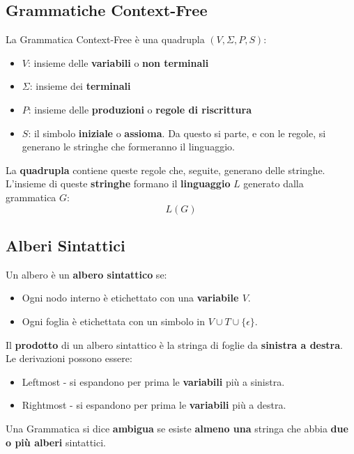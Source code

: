 \documentclass[12pt]{article}
\begin{document}
\subsection{Grammatiche Context-Free}
La Grammatica Context-Free è una quadrupla $(V,\Sigma,P,S)$:
\begin{itemize}
    \item $V$: insieme delle \textbf{variabili} o \textbf{non terminali}
    \item $\Sigma$: insieme dei \textbf{terminali}
    \item $P$: insieme delle \textbf{produzioni} o \textbf{regole di riscrittura}
    \item $S$: il simbolo \textbf{iniziale} o \textbf{assioma}. Da questo si parte, e con le regole, si generano le stringhe che formeranno il linguaggio.
\end{itemize}
La \textbf{quadrupla} contiene queste regole che, seguite, generano delle stringhe.\\
L'insieme di queste \textbf{stringhe} formano il \textbf{linguaggio} $L$ generato dalla grammatica $G$:
\begin{equation*}
    L(G)
\end{equation*}

\subsection{Alberi Sintattici}
Un albero è un \textbf{albero sintattico} se:
\begin{itemize}
    \item Ogni nodo interno è etichettato con una \textbf{variabile $V$}.
    \item Ogni foglia è etichettata con un simbolo in $V \cup T \cup \{\epsilon\}$.
\end{itemize}
Il \textbf{prodotto} di un albero sintattico è la stringa di foglie da \textbf{sinistra a destra}.\\
Le derivazioni possono essere:
\begin{itemize}
    \item Leftmost - si espandono per prima le \textbf{variabili} più a sinistra.
    \item Rightmost - si espandono per prima le \textbf{variabili} più a destra.
\end{itemize}
Una Grammatica si dice \textbf{ambigua} se esiste \textbf{almeno una} stringa che abbia \textbf{due o più alberi} sintattici.
\end{document}
